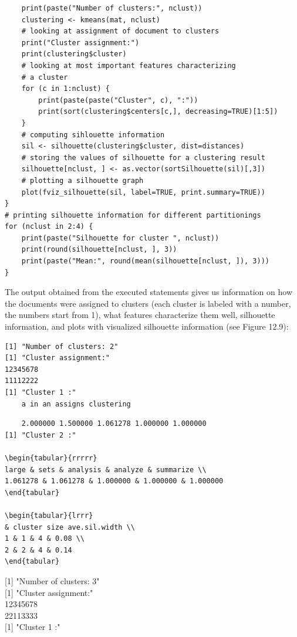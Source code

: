 \documentclass[10pt]{book}
\begin{document}
\begin{verbatim}
    print(paste("Number of clusters:", nclust))
    clustering <- kmeans(mat, nclust)
    # looking at assignment of document to clusters
    print("Cluster assignment:")
    print(clustering$cluster)
    # looking at most important features characterizing
    # a cluster
    for (c in 1:nclust) {
        print(paste(paste("Cluster", c), ":"))
        print(sort(clustering$centers[c,], decreasing=TRUE)[1:5])
    }
    # computing sihlouette information
    sil <- silhouette(clustering$cluster, dist=distances)
    # storing the values of silhouette for a clustering result
    silhouette[nclust, ] <- as.vector(sortSilhouette(sil)[,3])
    # plotting a silhouette graph
    plot(fviz_silhouette(sil, label=TRUE, print.summary=TRUE))
}
# printing silhouette information for different partitionings
for (nclust in 2:4) {
    print(paste("Silhouette for cluster ", nclust))
    print(round(silhouette[nclust, ], 3))
    print(paste("Mean:", round(mean(silhouette[nclust, ]), 3)))
}
\end{verbatim}

The output obtained from the executed statements gives us information on how the documents were assigned to clusters (each cluster is labeled with a number, the numbers start from 1), what features characterize them well, silhouette information, and plots with visualized silhouette information (see Figure 12.9):

\begin{verbatim}
[1] "Number of clusters: 2"
[1] "Cluster assignment:"
12345678
11112222
[1] "Cluster 1 :"
    a in an assigns clustering
\end{verbatim}

\begin{verbatim}
    2.000000 1.500000 1.061278 1.000000 1.000000
[1] "Cluster 2 :"

\begin{tabular}{rrrrr} 
large & sets & analysis & analyze & summarize \\
1.061278 & 1.061278 & 1.000000 & 1.000000 & 1.000000
\end{tabular}

\begin{tabular}{lrrr} 
& cluster size ave.sil.width \\
1 & 1 & 4 & 0.08 \\
2 & 2 & 4 & 0.14
\end{tabular}
\end{verbatim}

[1] "Number of clusters: 3"\\[0pt]
[1] "Cluster assignment:"\\
12345678\\
22113333\\[0pt]
[1] "Cluster 1 :"
\end{document}
